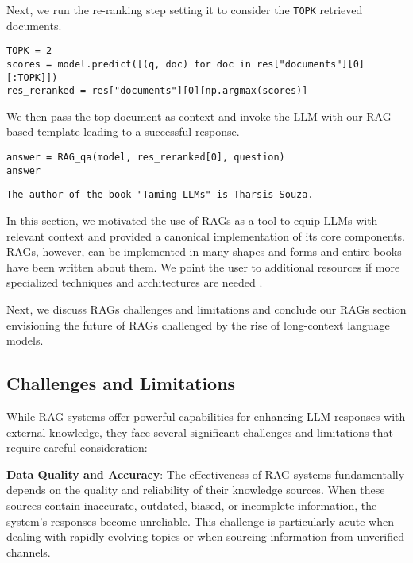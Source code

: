 Next, we run the re-ranking step setting it to consider the \texttt{TOPK} retrieved documents.

\begin{verbatim}
TOPK = 2
scores = model.predict([(q, doc) for doc in res["documents"][0][:TOPK]])
res_reranked = res["documents"][0][np.argmax(scores)]
\end{verbatim}

We then pass the top document as context and invoke the LLM with our RAG-based template leading to a successful response.

\begin{verbatim}
answer = RAG_qa(model, res_reranked[0], question)
answer
\end{verbatim}

\begin{verbatim}
The author of the book "Taming LLMs" is Tharsis Souza.
\end{verbatim}
In this section, we motivated the use of RAGs as a tool to equip LLMs with relevant context and provided a canonical implementation of its core components. RAGs, however, can be implemented in many shapes and forms and entire books have been written about them. We point the user to additional resources if more specialized techniques and architectures are needed .

Next, we discuss RAGs challenges and limitations and conclude our RAGs section envisioning the future of RAGs challenged by the rise of long-context language models.

\subsection{Challenges and Limitations}

While RAG systems offer powerful capabilities for enhancing LLM responses with external knowledge, they face several significant challenges and limitations that require careful consideration:
 
\textbf{Data Quality and Accuracy}: The effectiveness of RAG systems fundamentally depends on the quality and reliability of their knowledge sources. When these sources contain inaccurate, outdated, biased, or incomplete information, the system's responses become unreliable. This challenge is particularly acute when dealing with rapidly evolving topics or when sourcing information from unverified channels.
 

